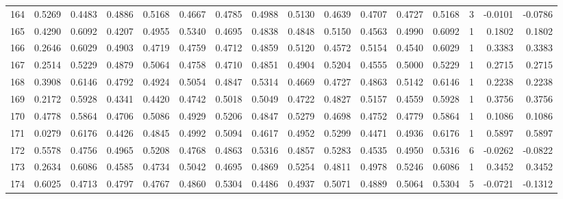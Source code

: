 \begin{tabular}{lrrrrrrrrrrrrrrr}
164 &      0.5269 &  0.4483 &  0.4886 &  0.5168 &  0.4667 &  0.4785 &  0.4988 &  0.5130 &  0.4639 &  0.4707 &   0.4727 &     0.5168 &      3 &                   -0.0101 &                    -0.0786 \\
165 &      0.4290 &  0.6092 &  0.4207 &  0.4955 &  0.5340 &  0.4695 &  0.4838 &  0.4848 &  0.5150 &  0.4563 &   0.4990 &     0.6092 &      1 &                    0.1802 &                     0.1802 \\
166 &      0.2646 &  0.6029 &  0.4903 &  0.4719 &  0.4759 &  0.4712 &  0.4859 &  0.5120 &  0.4572 &  0.5154 &   0.4540 &     0.6029 &      1 &                    0.3383 &                     0.3383 \\
167 &      0.2514 &  0.5229 &  0.4879 &  0.5064 &  0.4758 &  0.4710 &  0.4851 &  0.4904 &  0.5204 &  0.4555 &   0.5000 &     0.5229 &      1 &                    0.2715 &                     0.2715 \\
168 &      0.3908 &  0.6146 &  0.4792 &  0.4924 &  0.5054 &  0.4847 &  0.5314 &  0.4669 &  0.4727 &  0.4863 &   0.5142 &     0.6146 &      1 &                    0.2238 &                     0.2238 \\
169 &      0.2172 &  0.5928 &  0.4341 &  0.4420 &  0.4742 &  0.5018 &  0.5049 &  0.4722 &  0.4827 &  0.5157 &   0.4559 &     0.5928 &      1 &                    0.3756 &                     0.3756 \\
170 &      0.4778 &  0.5864 &  0.4706 &  0.5086 &  0.4929 &  0.5206 &  0.4847 &  0.5279 &  0.4698 &  0.4752 &   0.4779 &     0.5864 &      1 &                    0.1086 &                     0.1086 \\
171 &      0.0279 &  0.6176 &  0.4426 &  0.4845 &  0.4992 &  0.5094 &  0.4617 &  0.4952 &  0.5299 &  0.4471 &   0.4936 &     0.6176 &      1 &                    0.5897 &                     0.5897 \\
172 &      0.5578 &  0.4756 &  0.4965 &  0.5208 &  0.4768 &  0.4863 &  0.5316 &  0.4857 &  0.5283 &  0.4535 &   0.4950 &     0.5316 &      6 &                   -0.0262 &                    -0.0822 \\
173 &      0.2634 &  0.6086 &  0.4585 &  0.4734 &  0.5042 &  0.4695 &  0.4869 &  0.5254 &  0.4811 &  0.4978 &   0.5246 &     0.6086 &      1 &                    0.3452 &                     0.3452 \\
174 &      0.6025 &  0.4713 &  0.4797 &  0.4767 &  0.4860 &  0.5304 &  0.4486 &  0.4937 &  0.5071 &  0.4889 &   0.5064 &     0.5304 &      5 &                   -0.0721 &                    -0.1312 \\

\end{tabular}
